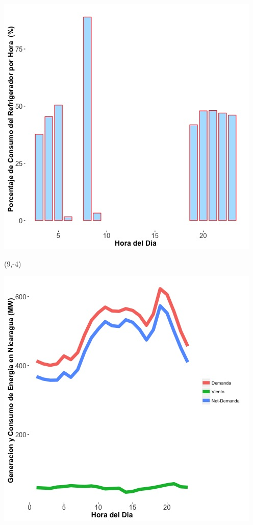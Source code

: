 \documentclass{article}\usepackage[]{graphicx}\usepackage[]{color}
\newenvironment{knitrout}{}{} %
\begin{document}
\begin{knitrout}
\color{fgcolor}
\includegraphics[scale=0.65]{figure/A21_fridge_energy_pct.jpg} 
\end{knitrout}

 \begin{textblock}{1}(9,-4)
\begin{minipage}{20em}
\begingroup

\endgroup
\end{minipage}
\end{textblock}

\begin{knitrout}
\color{fgcolor}
\includegraphics[scale=0.65]{figure/gridplot1.jpg} 
\end{knitrout}
\end{document}
